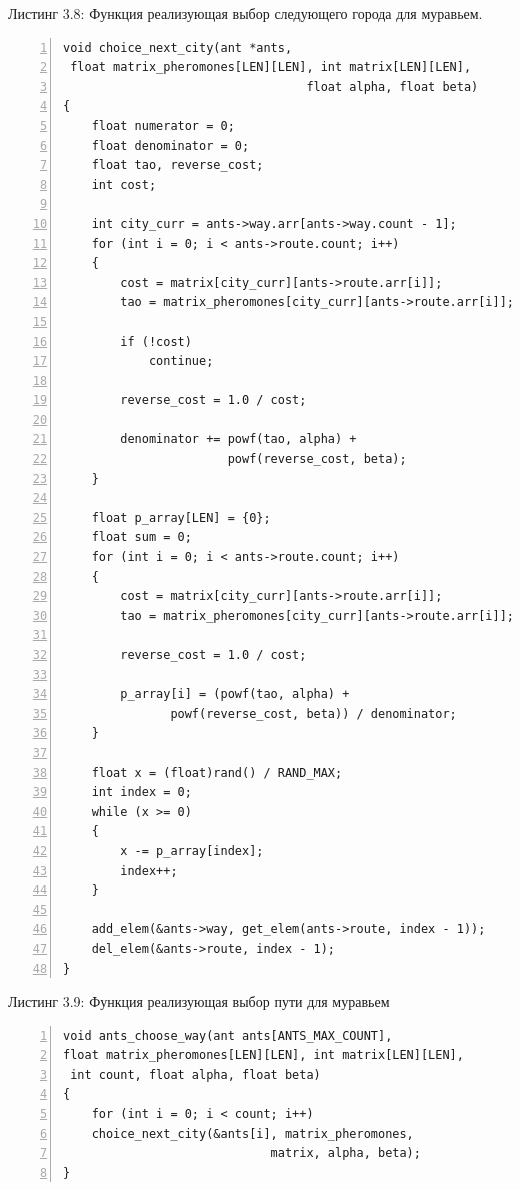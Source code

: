 \documentclass[12pt,a4paper]{report}
\begin{document}
\noindent\textrm{Листинг 3.8: Функция реализующая выбор следующего города для муравьем.}
\begin{lstlisting}[frame=single, numbers=left]
void choice_next_city(ant *ants, 
 float matrix_pheromones[LEN][LEN], int matrix[LEN][LEN],
                                  float alpha, float beta)
{
    float numerator = 0;
    float denominator = 0;
    float tao, reverse_cost;
    int cost;
	
    int city_curr = ants->way.arr[ants->way.count - 1];
    for (int i = 0; i < ants->route.count; i++)
    {
        cost = matrix[city_curr][ants->route.arr[i]];
        tao = matrix_pheromones[city_curr][ants->route.arr[i]];
		
        if (!cost)
		    continue;
		
        reverse_cost = 1.0 / cost;
		
        denominator += powf(tao, alpha) + 
                       powf(reverse_cost, beta);
    }
	
    float p_array[LEN] = {0};
    float sum = 0;
    for (int i = 0; i < ants->route.count; i++)
    {
        cost = matrix[city_curr][ants->route.arr[i]];
        tao = matrix_pheromones[city_curr][ants->route.arr[i]];
		
        reverse_cost = 1.0 / cost;
		
        p_array[i] = (powf(tao, alpha) + 
               powf(reverse_cost, beta)) / denominator;
    }

    float x = (float)rand() / RAND_MAX;
    int index = 0;
    while (x >= 0)
    {
        x -= p_array[index];
        index++;
    }
	
    add_elem(&ants->way, get_elem(ants->route, index - 1));
    del_elem(&ants->route, index - 1);
}

\end{lstlisting}


\noindent\textrm{Листинг 3.9: Функция реализующая выбор пути для муравьем}
\begin{lstlisting}[frame=single, numbers=left]
void ants_choose_way(ant ants[ANTS_MAX_COUNT], 
float matrix_pheromones[LEN][LEN], int matrix[LEN][LEN],
 int count, float alpha, float beta)
{
    for (int i = 0; i < count; i++)
    choice_next_city(&ants[i], matrix_pheromones, 
                             matrix, alpha, beta);
}
\end{lstlisting}



	
\end{document}
